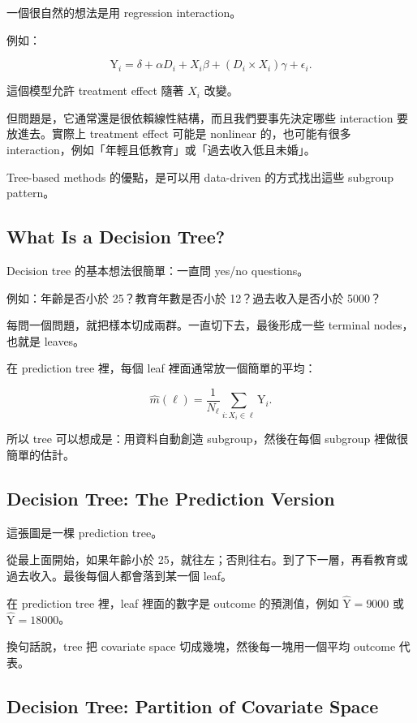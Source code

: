 \documentclass[
  chinese,
  11pt,
]{article}
\begin{document}
一個很自然的想法是用 regression interaction。

例如：

\[
\mathrm{Y}_i
=
\delta+\alpha D_i+X_i\beta+(D_i\times X_i)\gamma+\epsilon_i.
\]

這個模型允許 treatment effect 隨著 \(X_i\) 改變。

但問題是，它通常還是很依賴線性結構，而且我們要事先決定哪些 interaction
要放進去。實際上 treatment effect 可能是 nonlinear 的，也可能有很多
interaction，例如「年輕且低教育」或「過去收入低且未婚」。

Tree-based methods 的優點，是可以用 data-driven 的方式找出這些 subgroup
pattern。

\subsection{What Is a Decision Tree?}\label{what-is-a-decision-tree}

Decision tree 的基本想法很簡單：一直問 yes/no questions。

例如：年齡是否小於 25？教育年數是否小於 12？過去收入是否小於 5000？

每問一個問題，就把樣本切成兩群。一直切下去，最後形成一些 terminal
nodes，也就是 leaves。

在 prediction tree 裡，每個 leaf 裡面通常放一個簡單的平均：

\[
\hat{m}(\ell)=\frac{1}{N_\ell}\sum_{i:X_i\in \ell}\mathrm{Y}_i.
\]

所以 tree 可以想成是：用資料自動創造 subgroup，然後在每個 subgroup
裡做很簡單的估計。

\subsection{Decision Tree: The Prediction
Version}\label{decision-tree-the-prediction-version}

這張圖是一棵 prediction tree。

從最上面開始，如果年齡小於
25，就往左；否則往右。到了下一層，再看教育或過去收入。最後每個人都會落到某一個
leaf。

在 prediction tree 裡，leaf 裡面的數字是 outcome 的預測值，例如
\(\hat{\mathrm{Y}}=9000\) 或 \(\hat{\mathrm{Y}}=18000\)。

換句話說，tree 把 covariate space 切成幾塊，然後每一塊用一個平均 outcome
代表。

\subsection{Decision Tree: Partition of Covariate
Space}\label{decision-tree-partition-of-covariate-space}
\end{document}

